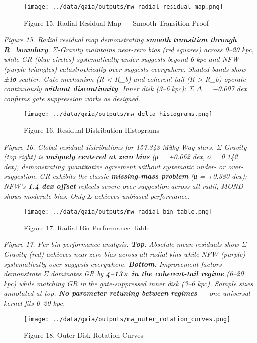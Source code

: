 \documentclass[11pt,a4paper]{article}
\begin{document}
\begin{figure}[h]
\centering
\texttt{[image: ../data/gaia/outputs/mw\_radial\_residual\_map.png]}
\caption{Figure 15. Radial Residual Map — Smooth Transition Proof}
\end{figure}


\textit{Figure 15. Radial residual map demonstrating \textbf{smooth transition through R\_boundary}. Σ-Gravity maintains near-zero bias (red squares) across 0–20 kpc, while GR (blue circles) systematically under-suggests beyond 6 kpc and NFW (purple triangles) catastrophically over-suggests everywhere. Shaded bands show ±1σ scatter. Gate mechanism (R < R\_b) and coherent tail (R > R\_b) operate continuously \textbf{without discontinuity}. Inner disk (3–6 kpc): Σ Δ = −0.007 dex confirms gate suppression works as designed.}


\begin{figure}[h]
\centering
\texttt{[image: ../data/gaia/outputs/mw\_delta\_histograms.png]}
\caption{Figure 16. Residual Distribution Histograms}
\end{figure}


\textit{Figure 16. Global residual distributions for 157,343 Milky Way stars. Σ-Gravity (top right) is \textbf{uniquely centered at zero bias} (μ = +0.062 dex, σ = 0.142 dex), demonstrating quantitative agreement without systematic under- or over-suggestion. GR exhibits the classic \textbf{missing-mass problem} (μ = +0.380 dex); NFW's \textbf{1.4 dex offset} reflects severe over-suggestion across all radii; MOND shows moderate bias. Only Σ achieves unbiased performance.}


\begin{figure}[h]
\centering
\texttt{[image: ../data/gaia/outputs/mw\_radial\_bin\_table.png]}
\caption{Figure 17. Radial-Bin Performance Table}
\end{figure}


\textit{Figure 17. Per-bin performance analysis. \textbf{Top}: Absolute mean residuals show Σ-Gravity (red) achieves near-zero bias across all radial bins while NFW (purple) systematically over-suggests everywhere. \textbf{Bottom}: Improvement factors demonstrate Σ dominates GR by \textbf{4–13× in the coherent-tail regime} (6–20 kpc) while matching GR in the gate-suppressed inner disk (3–6 kpc). Sample sizes annotated at top. \textbf{No parameter retuning between regimes} — one universal kernel fits 0–20 kpc.}


\begin{figure}[h]
\centering
\texttt{[image: ../data/gaia/outputs/mw\_outer\_rotation\_curves.png]}
\caption{Figure 18. Outer-Disk Rotation Curves}
\end{figure}
\end{document}
